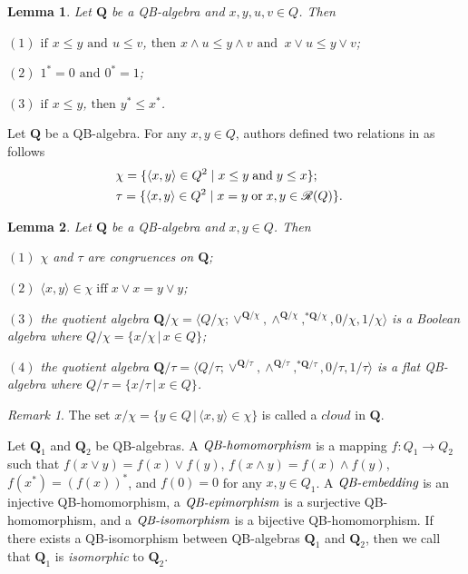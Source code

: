 \documentclass[12pt]{amsart}
\newtheorem{lemma}{Lemma}[section]
\theoremstyle{definition}
\theoremstyle{remark}
\newtheorem{remark}{Remark}[section]
\numberwithin{equation}{section}
\begin{document}
\begin{lemma}\label{Lemma 1}\emph{\cite{QB}}
Let $\mathbf{Q}$  be a QB-algebra and $x,y,u,v\in Q$. Then

$\mathrm{(1)}$ $\mathrm{if}$ $x\leq y$ $\mathrm{and}$ $u\leq v$, $\mathrm{then}$ $x\wedge u\leq y\wedge v$ $\mathrm{and}$ $\, x\vee u\leq y\vee v$;

$\mathrm{(2)}$ $1^{\ast}=0$ $\mathrm{and}$ $0^{\ast}=1$;

$\mathrm{(3)}$ $\mathrm{if}$ $x \leq y$, $\mathrm{then}$ $y^{\ast}\leq  x^{\ast}$.
\end{lemma}

Let $\mathbf{Q}$  be a QB-algebra. For any $x,y\in Q$, authors defined two relations in \cite{QB} as follows
\begin{align}
&\chi=\{\langle x,y\rangle \in Q^{2} \mid x\leq y\; \mathrm{and}\; y\leq x\};\cr
&\tau=\{\langle x,y\rangle \in Q^{2} \mid x=y \;\mathrm{or}\; x,y\in\mathscr{R}(Q) \}. \nonumber
\end{align}


\begin{lemma}\label{Lemma 2}\emph{\cite{QB}}
Let $\mathbf{Q}$ be a QB-algebra and $x,y\in Q$. Then

$\mathrm{(1)}$ $\chi$ and $\tau$ are congruences on $\mathbf{Q}$;

$\mathrm{(2)}$ $\langle x,y \rangle \in \chi \;\mathrm{iff}\; x\vee x=y\vee y$;

$\mathrm{(3)}$ the quotient algebra $\mathbf{Q}/ \chi= \langle Q/ \chi; \vee^{\mathbf{Q}/ \chi},\wedge^{\mathbf{Q}/ \chi}, ^{\ast{\mathbf{Q}/ \chi}}, 0/\chi, 1/\chi  \rangle $ is a Boolean algebra where $Q/ \chi=\{x/ \chi\,|\,x\in Q\}$;

$\mathrm{(4)}$ the quotient algebra $\mathbf{Q}/ \tau= \langle Q/ \tau; \vee^{\mathbf{Q}/ \tau},\wedge^{\mathbf{Q}/ \tau}, ^{\ast{\mathbf{Q}/ \tau}}, 0/\tau, 1/\tau  \rangle $ is a flat QB-algebra where $ Q/ \tau=\{x/ \tau\,|\,x\in Q\}$.

\end{lemma}
\begin{remark}
The set $x/\chi=\{y\in Q \,|\,\langle x,y\rangle\in \chi\}$ is called a $cloud$ in $\mathbf{Q}$.
\end{remark}

Let $\mathbf{Q}_{1}$ and $\mathbf{Q}_{2}$ be QB-algebras. A $\emph{QB-homomorphism}$ is a mapping $f: Q_{1}\rightarrow Q _{2}$ such that $f(x\vee y)=f(x) \vee f(y)$, $f(x\wedge y)=f(x) \wedge f(y)$, $f(x^{\ast})=(f(x))^{\ast}$, and $f(0)=0$ for any $x,y\in Q_{1}$. A $\emph{QB-embedding}$ is an injective QB-homomorphism, a $\emph{QB-epimorphism}$ is a surjective QB-homomorphism, and a $\emph{QB-isomorphism}$ is a bijective QB-homomorphism. If there exists a QB-isomorphism between QB-algebras $\mathbf{Q}_{1}$ and $\mathbf{Q}_{2}$, then we call that $\mathbf{Q}_{1}$ is \emph{isomorphic} to $\mathbf{Q}_{2}$.
\end{document}
